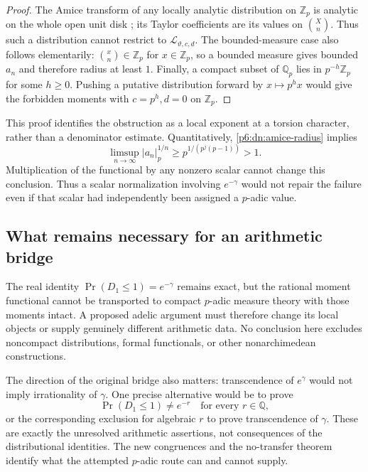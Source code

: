 \documentclass[11pt,a4paper]{article}
\theoremstyle{definition}
\theoremstyle{remark}
\numberwithin{equation}{section}
\begin{document}
\begin{proof}
The Amice transform of any locally analytic distribution on
$\mathbb Z_p$ is analytic on the whole open unit disk
\cite[Theorem~2.2]{p6:SchneiderTeitelbaum2001}; its Taylor coefficients
are its values on $\binom Xn$.  Thus such a distribution cannot
restrict to $\mathcal L_{\vartheta,c,d}$.  The bounded-measure
case also follows elementarily: $\binom xn\in\mathbb Z_p$ for
$x\in\mathbb Z_p$, so a bounded measure gives bounded $a_n$ and
therefore radius at least $1$.
Finally, a compact subset of $\mathbb Q_p$ lies in $p^{-h}\mathbb Z_p$
for some $h\ge0$.  Pushing a putative distribution forward by
$x\mapsto p^h x$ would give the forbidden moments with
$c=p^h,d=0$ on $\mathbb Z_p$.
\end{proof}

This proof identifies the obstruction as a local exponent at a torsion
character, rather than a denominator estimate.  Quantitatively,
\eqref{p6:dn:amice-radius} implies
\[
 \limsup_{n\to\infty}|a_n|_p^{1/n}
   \ge p^{1/(p^j(p-1))}>1.
\]
Multiplication of the functional by any nonzero scalar cannot change
this conclusion.  Thus a scalar normalization involving $e^{-\gamma}$
would not repair the failure even if that scalar had independently
been assigned a $p$-adic value.

\subsection{What remains necessary for an arithmetic bridge}

The real identity $\Pr(D_1\le1)=e^{-\gamma}$ remains exact, but the
rational moment functional cannot be transported to compact $p$-adic
measure theory with those moments intact.  A proposed adelic argument
must therefore change its local objects or supply genuinely different
arithmetic data.  No conclusion here excludes noncompact distributions,
formal functionals, or other nonarchimedean constructions.

The direction of the original bridge also matters: transcendence of
$e^\gamma$ would not imply irrationality of $\gamma$.  One precise
alternative would be to prove
\[
 \Pr(D_1\le1)\ne e^{-r}\quad\text{for every }r\in\mathbb Q,
\]
or the corresponding exclusion for algebraic $r$ to prove
transcendence of $\gamma$.  These are exactly the unresolved
arithmetic assertions, not consequences of the distributional
identities.  The new congruences and the no-transfer theorem identify
what the attempted $p$-adic route can and cannot supply.

\end{document}
